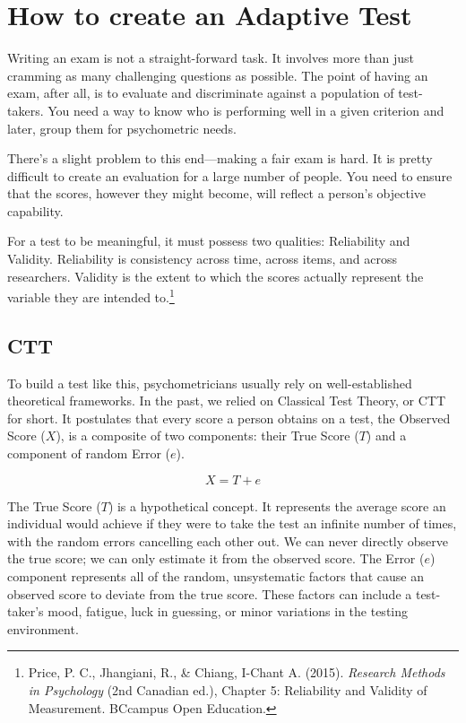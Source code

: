 \documentclass{article}
\begin{document}
\section*{How to create an Adaptive Test}

Writing an exam is not a straight-forward task. It involves more than just 
cramming as many challenging questions as possible. The point of having an exam, 
after all, is to evaluate and discriminate against a population of test-takers. 
You need a way to know who is performing well in a given criterion and later, 
group them for psychometric needs. 

There’s a slight problem to this end—making a fair exam is hard. It is pretty 
difficult to create an evaluation for a large number of people. You need to 
ensure that the scores, however they might become, will reflect a person’s 
objective capability.

For a test to be meaningful, it must possess two qualities: Reliability and 
Validity. Reliability is consistency across time, across items, and across 
researchers. Validity is the extent to which the scores actually represent 
the variable they are intended to.\footnote{Price, P. C., Jhangiani, R., \& Chiang, I-Chant A. (2015). \textit{Research Methods in Psychology} (2nd Canadian ed.), Chapter 5: Reliability and Validity of Measurement. BCcampus Open Education.}

\subsection*{CTT}

To build a test like this, psychometricians usually rely on well-established 
theoretical frameworks. In the past, we relied on Classical Test Theory, or CTT 
for short. It postulates that every score a person obtains on a test, the 
Observed Score ($X$), is a composite of two components: their True Score ($T$) 
and a component of random Error ($e$). 

\[
X = T + e
\]

The True Score ($T$) is a hypothetical concept. It represents the average score an 
individual would achieve if they were to take the test an infinite number of times,
 with the random errors cancelling each other out. We can never directly observe the
  true score; we can only estimate it from the observed score. The Error ($e$) component represents all of the random, unsystematic factors that cause an observed score to deviate from the true score. These factors can include a test-taker's mood, fatigue, luck in guessing, or minor variations in the testing environment.
\end{document}
